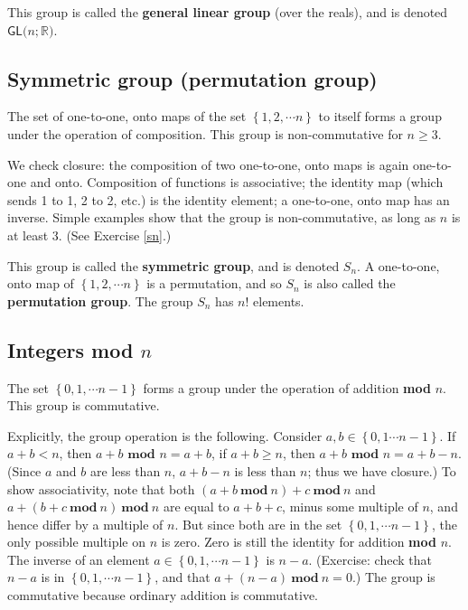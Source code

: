 \documentclass{amsbook}
\theoremstyle{plain}
\numberwithin{equation}{chapter}
\numberwithin{theorem}{chapter}
\begin{document}
This group is called the \textbf{general linear group} (over the reals), and
is denoted $\mathsf{GL}(n;\mathbb{R}\mathbf{)}$.

\subsection{Symmetric group (permutation group)}

The set of one-to-one, onto maps of the set $\left\{  1,2,\cdots n\right\}  $
to itself forms a group under the operation of composition. This group is
non-commutative for $n\geq3$.

We check closure: the composition of two one-to-one, onto maps is again
one-to-one and onto. Composition of functions is associative; the identity map
(which sends 1 to 1, 2 to 2, etc.) is the identity element; a one-to-one, onto
map has an inverse. Simple examples show that the group is non-commutative, as
long as $n$ is at least 3. (See Exercise \ref{sn}.)

This group is called the \textbf{symmetric group}, and is denoted $S_{n}$. A
one-to-one, onto map of $\left\{  1,2,\cdots n\right\}  $ is a permutation,
and so $S_{n}$ is also called the \textbf{permutation group}. The group
$S_{n}$ has $n!$ elements.

\subsection{Integers \textbf{mod} $n$}

The set $\left\{  0,1,\cdots n-1\right\}  $ forms a group under the operation
of addition \textbf{mod }$n$. This group is commutative.

Explicitly, the group operation is the following. Consider $a,b\in\left\{
0,1\cdots n-1\right\}  $. If $a+b<n$, then $a+b$ $\mathbf{mod}$ $n=a+b$, if
$a+b\geq n$, then $a+b$ $\mathbf{mod}$ $n=a+b-n$. (Since $a$ and $b$ are less
than $n$, $a+b-n$ is less than $n$; thus we have closure.) To show
associativity, note that both $(a+b\ \mathbf{mod}\ n)+c\ \mathbf{mod}\ n$ and
$a+(b+c\ \mathbf{mod}\ n)\ \mathbf{mod}\ n$ are equal to $a+b+c$, minus some
multiple of $n$, and hence differ by a multiple of $n$. But since both are in
the set $\left\{  0,1,\cdots n-1\right\}  $, the only possible multiple on $n$
is zero. Zero is still the identity for addition \textbf{mod} $n$. The inverse
of an element $a\in\left\{  0,1,\cdots n-1\right\}  $ is $n-a$. (Exercise:
check that $n-a$ is in $\left\{  0,1,\cdots n-1\right\}  $, and that
$a+(n-a)\ \mathbf{mod}\ n=0$.) The group is commutative because ordinary
addition is commutative.
\end{document}
